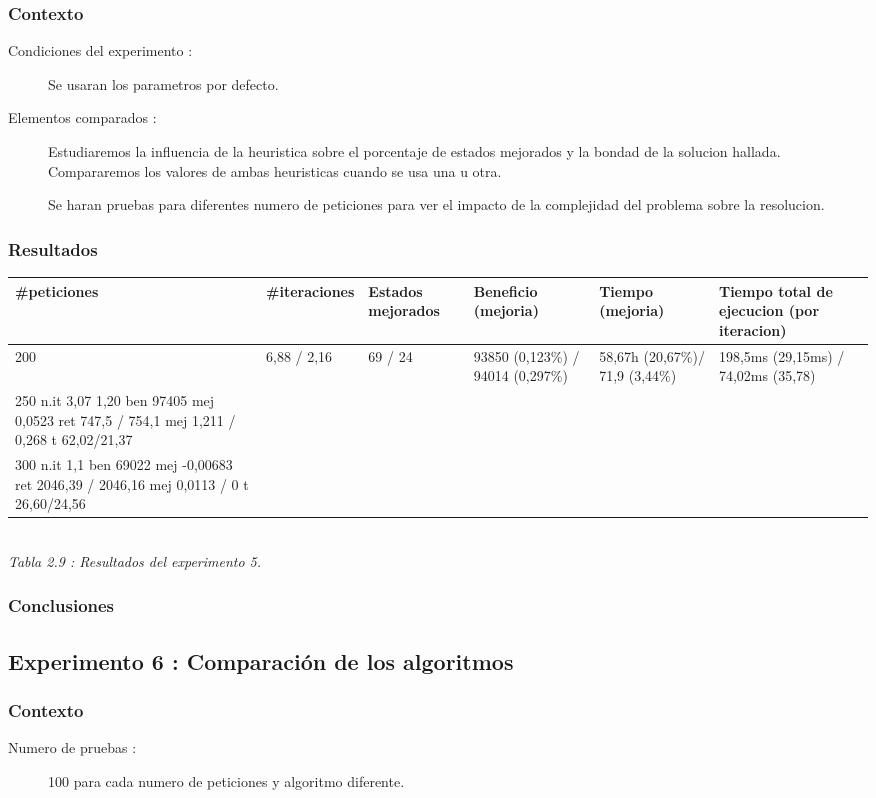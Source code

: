 \documentclass{article}
\begin{document}
\subsubsection{Contexto}
\begin{description}
\item[Condiciones del experimento :] Se usaran los parametros por defecto.
\item[Elementos comparados :] Estudiaremos la influencia de la heuristica sobre
el porcentaje de estados mejorados y la bondad de la solucion hallada.
Compararemos los valores de ambas heuristicas cuando se usa una u otra.

Se haran pruebas para diferentes numero de peticiones para ver el impacto de la
complejidad del problema sobre la resolucion.
\end{description}

\subsubsection{Resultados}
\noindent 
\begin{center}
\begin{tabular}{|l|l|l|l|l|l|}
\hline
\#peticiones & \#iteraciones & Estados mejorados & Beneficio (mejoria) &
Tiempo (mejoria) & Tiempo total de ejecucion (por iteracion)\\
\hline
200 & 6,88 / 2,16 & 69 / 24 & 93850 (0,123\%) / 94014 (0,297\%) & 58,67h
(20,67\%)/ 71,9 (3,44\%) & 198,5ms (29,15ms) / 74,02ms (35,78)\\
\hline
250
n.it 3,07 1,20
ben 97405
mej 0,0523
ret 747,5 / 754,1
mej 1,211 / 0,268
t 62,02/21,37\\
\hline
300
n.it 1,1
ben 69022
mej -0,00683
ret 2046,39 / 2046,16
mej 0,0113 / 0
t 26,60/24,56\\
\hline
\end{tabular}\\
{\it Tabla 2.9 : Resultados del experimento 5.}
\end{center}

\subsubsection{Conclusiones}

\subsection{Experimento 6 : Comparación de los algoritmos}

\subsubsection{Contexto}
\begin{description}
\item[Numero de pruebas :] 100 para cada numero de peticiones y algoritmo
diferente.
\end{description}
\end{document}
